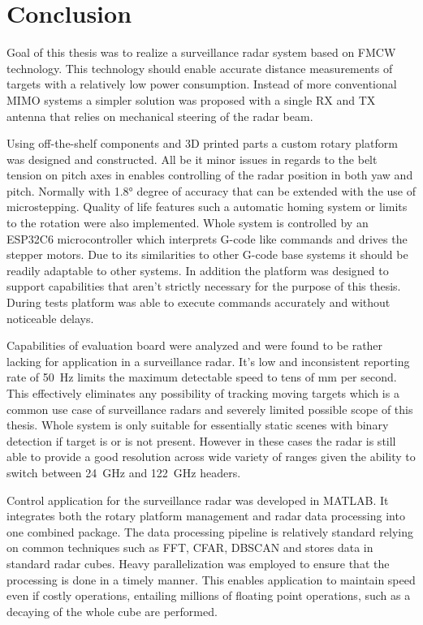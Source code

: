 \chapter*{Conclusion}

Goal of this thesis was to realize a surveillance radar system based on FMCW technology.
This technology should enable accurate distance measurements of targets with a relatively low power consumption.
Instead of more conventional MIMO systems a simpler solution was proposed with a single RX and TX antenna that relies on mechanical steering of the radar beam.

Using off-the-shelf components and 3D printed parts a custom rotary platform was designed and constructed.
All be it minor issues in regards to the belt tension on pitch axes in enables controlling of the radar position in both yaw and pitch.
Normally with 1.8° degree of accuracy that can be extended with the use of microstepping.
Quality of life features such a automatic homing system or limits to the rotation were also implemented.
Whole system is controlled by an ESP32C6 microcontroller which interprets G-code like commands and drives the stepper motors.
Due to its similarities to other G-code base systems it should be readily adaptable to other systems.
In addition the platform was designed to support capabilities that aren't strictly necessary for the purpose of this thesis.
During tests platform was able to execute commands accurately and without noticeable delays.

Capabilities of \sidar evaluation board were analyzed and were found to be rather lacking for application in a surveillance radar.
It's low and inconsistent reporting rate of 50~Hz limits the maximum detectable speed to tens of mm per second.
This effectively eliminates any possibility of tracking moving targets which is a common use case of surveillance radars and severely limited possible scope of this thesis.
Whole system is only suitable for essentially static scenes with binary detection if target is or is not present.
However in these cases the radar is still able to provide a good resolution across wide variety of ranges given the ability to switch between 24~GHz and 122~GHz headers.

Control application for the surveillance radar was developed in MATLAB.
It integrates both the rotary platform management and radar data processing into one combined package.
The data processing pipeline is relatively standard relying on common techniques such as FFT, CFAR, DBSCAN and stores data in standard radar cubes.
Heavy parallelization was employed to ensure that the processing is done in a timely manner.
This enables application to maintain speed even if costly operations, entailing millions of floating point operations, such as a decaying of the whole cube are performed.

